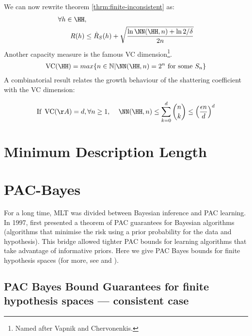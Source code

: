 We can now rewrite theorem \ref{thrm:finite-inconsistent} as:
\begin{align}
	\forall h \in \HH&,\nonumber\\
	R(h)&\leq \hat{R}_{S}(h) + \sqrt{\frac{\ln{\NN(\HH, n)}+ \ln{2/\delta}}{2n}}
\end{align}
Another capacity measure is the famous VC dimension\footnote{Named after Vapnik and Chervonenkis.}.
\begin{align}
	\operatorname{VC}(\HH)=max\{n \in \mathbb{N}| \NN(\HH, n)=2^n \text{ for some }S_n\}
\end{align}
A combinatorial result relates the growth behaviour of the shattering coefficient with the VC dimension:
\begin{theorem}
	\begin{align}
		\text{If }&\operatorname{VC}(\AA)=d, \forall n \geq 1,\nonumber
		 ~&\NN(\HH, n) \leq \sum_{k=0}^d \binom{n}{k} \leq\left(\frac{\epsilon n}{d}\right)^d
	\end{align}
\end{theorem}

%
\section{Minimum Description Length}
\section{PAC-Bayes}
For a long time, \ac{MLT} was divided between Bayesian inference and PAC learning. In 1997, \citeauthor{shawe-taylor:1997} first presented a theorem of PAC guarantees for Bayesian algorithms (algorithms that minimise the risk using a prior probability for the data and hypothesis)\cite{shawe-taylor:1997}. This bridge allowed tighter PAC bounds for learning algorithms that take advantage of informative priors. Here we give PAC Bayes bounds for finite hypothesis spaces (for more, see \cite{mcallester:1999} and \cite{macallester:2013}).
\subsection{PAC Bayes Bound Guarantees for finite hypothesis spaces --- consistent case}

